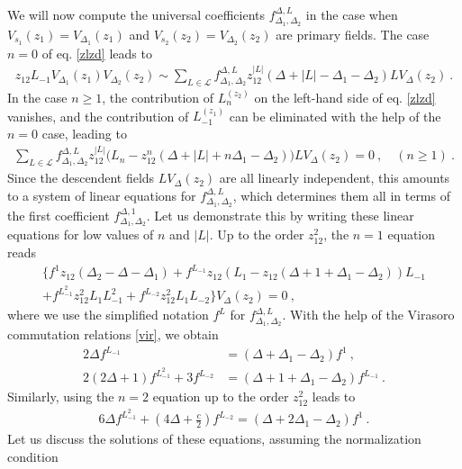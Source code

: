 \documentclass[12pt,a4paper,notitlepage]{report}
\numberwithin{equation}{section}
\theoremstyle{break}
\begin{document}
We will now compute the universal coefficients $f_{\Delta_1,\Delta_2}^{\Delta,L}$ in 
the case when $V_{s_1}(z_1)=V_{\Delta_1}(z_1)$ and $V_{s_2}(z_2)=V_{\Delta_2}(z_2)$ are primary fields.
The case $n=0$ of eq. \eqref{zlzd} leads to
\begin{align}
 z_{12}L_{-1}V_{\Delta_1}(z_1) V_{\Delta_2}(z_2) \sim \sum_{L\in \mathcal{L}} f_{\Delta_1,\Delta_2}^{\Delta,L} z_{12}^{|L|} 
(\Delta+|L|-\Delta_1-\Delta_2) LV_\Delta(z_2)\ .
\label{zot}
\end{align}
In the case $n\geq 1$, the contribution of $L_n^{(z_2)}$ on the left-hand side of eq. \eqref{zlzd} vanishes, and the contribution of $L_{-1}^{(z_1)}$ can be eliminated with the help of the $n=0$ case, leading to
\begin{align}
 \sum_{L\in \mathcal{L}}f_{\Delta_1,\Delta_2}^{\Delta,L} z_{12}^{|L|} \big(L_n-z_{12}^n(\Delta+|L|+n\Delta_1-\Delta_2)\big) LV_\Delta(z_2) = 0\ , \quad (n\geq 1)\ .
\label{sll}
\end{align}
Since the descendent fields $LV_\Delta(z_2)$ are all linearly independent, this amounts to a system of linear equations for $f_{\Delta_1,\Delta_2}^{\Delta,L}$, which determines them all in terms of the first coefficient $f_{\Delta_1,\Delta_2}^{\Delta,1}$.
Let us demonstrate this by writing these linear equations for low values of $n$ and $|L|$.
Up to the order $z_{12}^2$, the $n=1$ equation reads 
\begin{multline}
 \Big\{f^1 z_{12}(\Delta_2-\Delta-\Delta_1) +f^{L_{-1}} z_{12}\left(L_1-z_{12}(\Delta+1+\Delta_1-\Delta_2)\right)L_{-1}  
\\ 
+ f^{L_{-1}^2}z_{12}^2 L_1L_{-1}^2 +  f^{L_{-2}}z_{12}^2 L_1L_{-2}\Big\} V_{\Delta}(z_2) = 0\ ,
\end{multline}
where we use the simplified notation $f^L $ for  $f_{\Delta_1,\Delta_2}^{\Delta,L}$.
With the help of the Virasoro commutation relations \eqref{vir}, we obtain 
\begin{align}
 2\Delta f^{L_{-1}} &= (\Delta+\Delta_1-\Delta_2) f^1 \ ,
\label{flfo}
\\
 2(2\Delta+1) f^{L_{-1}^2} + 3 f^{L_{-2}} & = (\Delta+1+\Delta_1-\Delta_2) f^{L_{-1}}\ .
\end{align}
Similarly, using the $n=2$ equation up to the order $z_{12}^2$ leads to 
\begin{align}
 6\Delta f^{L_{-1}^2} + (4\Delta+\tfrac{c}{2})f^{L_{-2}} = (\Delta+2\Delta_1-\Delta_2) f^1\ .
\end{align}
Let us discuss the solutions of these equations, assuming the normalization condition 
\end{document}
